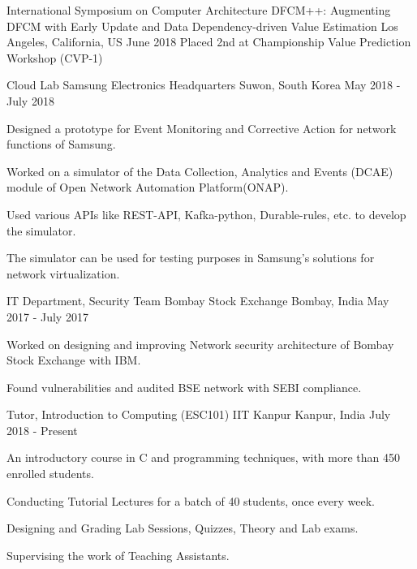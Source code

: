 \documentclass[12pt, a4paper]{awesome-cv}
\begin{document}
\begin{cventries}
    \cventry
    {International Symposium on Computer Architecture}
    {DFCM++: Augmenting DFCM with Early Update and Data Dependency-driven Value Estimation}
    {Los Angeles, California, US}
    {June 2018}
    {Placed 2nd at Championship Value Prediction Workshop (CVP-1)}
\end{cventries}

\begin{cventries}
    \cventry
    {Cloud Lab}
    {Samsung Electronics Headquarters}
    {Suwon, South Korea}
    {May 2018 - July 2018}
    {
        \begin{cvitems}
        \item Designed a prototype for Event Monitoring and Corrective Action for network functions of Samsung.
        \item Worked on a simulator of the Data Collection, Analytics and Events (DCAE) module of Open Network Automation Platform(ONAP).
        \item Used various APIs like REST-API, Kafka-python, Durable-rules, etc. to develop the simulator.
        \item The simulator can be used for testing purposes in Samsung's solutions for network virtualization.
        \end{cvitems}
    }

    \cventry
    {IT Department, Security Team}
    {Bombay Stock Exchange}
    {Bombay, India}
    {May 2017 - July 2017}
    {
        \begin{cvitems}
            \item Worked on designing and improving Network security architecture of Bombay Stock Exchange with IBM. 
            \item Found vulnerabilities and audited BSE network with SEBI compliance. 
        \end{cvitems}
    }

    \cventry
    {Tutor, Introduction to Computing (ESC101)}
    {IIT Kanpur}
    {Kanpur, India}
    {July 2018 - Present}
    {
        \begin{cvitems}
            \item An introductory course in C and programming techniques, with more than 450 enrolled students.
            \item Conducting Tutorial Lectures for a batch of 40 students, once every week.
            \item Designing and Grading Lab Sessions, Quizzes, Theory and Lab exams.
            \item Supervising the work of Teaching Assistants.
        \end{cvitems}
    }
\end{cventries}
\end{document}
